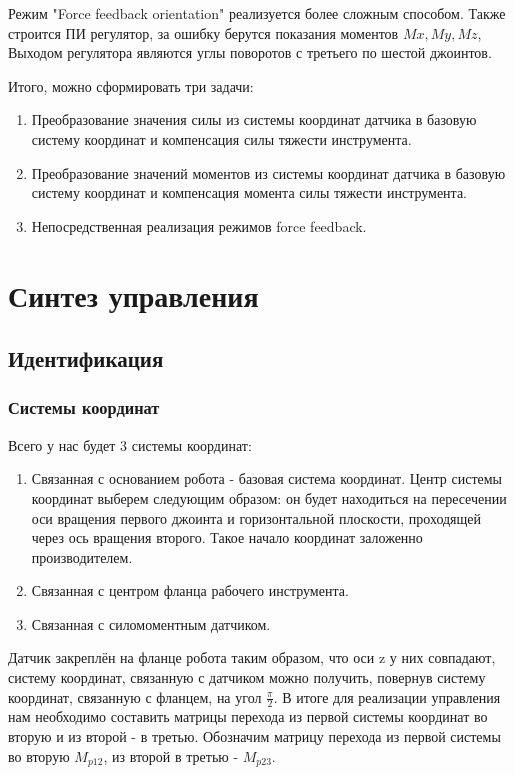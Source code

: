\documentclass[a4paper,14pt,russian]{extreport} \usepackage{extsizes}
\begin{document}
		Режим "Force feedback orientation" реализуется более сложным способом. Также строится ПИ регулятор, за ошибку берутся показания моментов $Mx, My, Mz$, Выходом регулятора являются углы поворотов с третьего по шестой джоинтов.
		
		Итого, можно сформировать три задачи:
		\begin{enumerate}   
			\item{	Преобразование значения силы  из системы координат датчика в базовую систему координат и компенсация силы тяжести инструмента. }
			\item{	Преобразование значений моментов из системы координат датчика в базовую систему координат и компенсация момента силы тяжести инструмента.}
			\item{	Непосредственная реализация режимов force feedback.}
		\end{enumerate}   
		\chapter{Синтез управления}
		\section{Идентификация}
		\subsection{Системы координат}
		Всего у нас будет 3 системы координат: 
		\begin{enumerate}
			\item Связанная с основанием робота - базовая система координат. Центр системы координат выберем следующим образом: он будет находиться на пересечении оси вращения первого джоинта и горизонтальной плоскости, проходящей через ось вращения второго. Такое начало координат заложенно производителем. 
			\item Связанная с центром фланца рабочего инструмента.
			\item Связанная с силомоментным датчиком. 		
		\end{enumerate}
		Датчик закреплён на фланце робота таким образом, что оси z у них совпадают, систему координат, связанную с датчиком можно получить, повернув систему координат, связанную с фланцем, на угол $\frac{\pi}{2}$.
		В итоге для реализации управления нам необходимо составить матрицы перехода из первой системы координат во вторую и из второй - в третью.
		Обозначим матрицу перехода из первой системы во вторую ${M_{p12}}$, из второй в третью - ${M_{p23}}$.	
\end{document}
